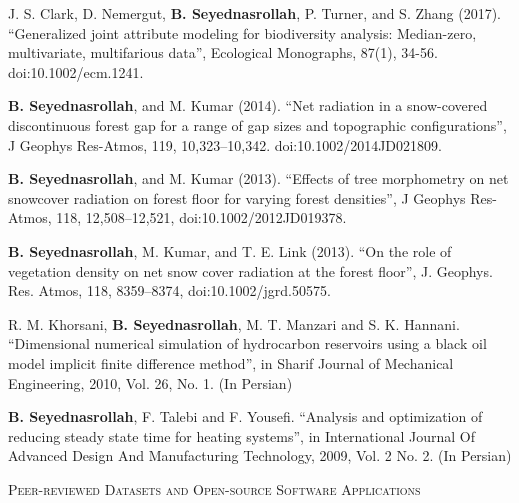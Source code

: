 \documentclass[10pt]{article}
\newenvironment{changemargin}[2]{%
  \begin{list}{}{%
    \setlength{\topsep}{0pt}%
    \setlength{\leftmargin}{#1}%
    \setlength{\rightmargin}{#2}%
    \setlength{\listparindent}{\parindent}%
    \setlength{\itemindent}{\parindent}%
    \setlength{\parsep}{\parskip}%
  }%
  \item[]}{\end{list}
}
\newcommand{\lineover}{
	\begin{changemargin}{-0.05in}{-0.05in}
		\vspace*{-8pt}
		\hrulefill \\
		\vspace*{-2pt}
	\end{changemargin}
}
\newcommand{\header}[1]{
	\begin{changemargin}{-0.5in}{-0.5in}
		\scshape{#1}\\
  	\lineover
	\end{changemargin}
}
\newenvironment{body} {
	\vspace*{-2pt}
	\begin{changemargin}{-0.5in}{-0.5in}
  }
	{\end{changemargin}
}
\begin{document}
\begin{body}
	J. S. Clark, D. Nemergut, \textbf{B. Seyednasrollah}, P. Turner, and S. Zhang (2017). ``Generalized joint attribute modeling for biodiversity analysis: Median-zero, multivariate, multifarious data'', Ecological Monographs, 87(1), 34-56. doi:10.1002/ecm.1241.\\
\medskip

	\textbf{B. Seyednasrollah}, and M. Kumar (2014). ``Net radiation in a snow-covered discontinuous forest gap for a range of gap sizes and topographic configurations'', J Geophys Res-Atmos, 119, 10,323–10,342. doi:10.1002/2014JD021809. \\
\medskip

	\textbf{B. Seyednasrollah}, and M. Kumar (2013). ``Effects of tree morphometry on net snowcover radiation on forest floor for varying forest densities'', J Geophys Res-Atmos, 118, 12,508–12,521, doi:10.1002/2012JD019378.\\
\medskip

	\textbf{B. Seyednasrollah}, M. Kumar, and T. E. Link (2013). ``On the role of vegetation density on net snow cover radiation at the forest floor'', J. Geophys. Res. Atmos, 118, 8359–8374, doi:10.1002/jgrd.50575.\\
\medskip

R. M. Khorsani, \textbf{B. Seyednasrollah}, M. T. Manzari and S. K. Hannani. ``Dimensional numerical simulation of hydrocarbon reservoirs using a black oil model implicit finite difference method'', in Sharif Journal of Mechanical Engineering, 2010, Vol. 26, No. 1. (In Persian)\\
\medskip

	 \textbf{B. Seyednasrollah}, F. Talebi and F. Yousefi. ``Analysis and optimization of reducing steady state time for heating systems'', in International Journal Of Advanced Design And Manufacturing Technology, 2009, Vol. 2 No. 2.  (In Persian)\\
\medskip


\end{body}

\medskip

\header{Peer-reviewed Datasets and Open-source Software Applications}
\end{document}
